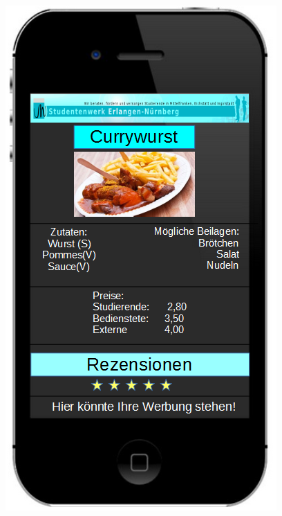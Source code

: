 \begin {itemize}
    \includegraphics[scale=0.4]{./inc/aufgabe05/MockupGericht}
\end{itemize}
        

    
